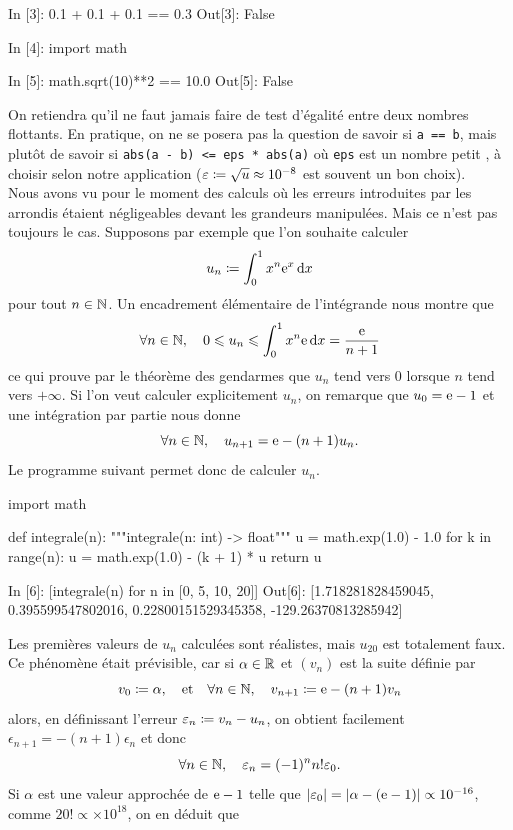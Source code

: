 \documentclass{magnolia}
\begin{document}
\begin{pythoncode}
In [3]: 0.1 + 0.1 + 0.1 == 0.3
Out[3]: False

In [4]: import math

In [5]: math.sqrt(10)**2 == 10.0 
Out[5]: False
\end{pythoncode}

\noindent
On retiendra qu'il ne faut jamais faire de test d'égalité entre deux nombres
flottants. En pratique, on ne se posera pas la question de savoir si \verb!a == b!, mais
plutôt de savoir si \verb!abs(a - b) <= eps * abs(a)! où \verb!eps! est un nombre
\og petit \fg, à choisir selon notre application ($\varepsilon\coloneqq\sqrt{u}\approx 10^{-8}$
est souvent un bon choix).\\

Nous avons vu pour le moment des calculs où les erreurs introduites par les arrondis
étaient négligeables devant les grandeurs manipulées. Mais ce n'est pas toujours le
cas. Supposons par exemple que l'on souhaite calculer
\[u_n\coloneqq\int_{0}^{1} x^n {\rm e}^x\,\text{d}x\]
pour tout $n\in\mathbb{N}$. Un encadrement élémentaire de l'intégrande nous montre que
\[\forall n\in\mathbb{N},\quad 0\leqslant u_n\leqslant \int_{0}^{1} x^n {\rm e}\,\text{d}x=\frac{{\rm e}}{n+1}\]
ce qui prouve par le théorème des gendarmes que $u_n$ tend vers
0 lorsque $n$ tend vers $+\infty$. Si l'on veut calculer explicitement $u_n$, 
on remarque que $u_0={\rm e}-1$ et une intégration par partie nous donne
\[\forall n\in\mathbb{N},\quad u_{n+1}={\rm e}-(n+1) u_{n}.\]
Le programme suivant permet donc de calculer $u_n$.
\begin{pythoncodeline}
import math

def integrale(n):
    """integrale(n: int) -> float"""
    u = math.exp(1.0) - 1.0
    for k in range(n):
        u = math.exp(1.0) - (k + 1) * u
    return u
\end{pythoncodeline}
\begin{pythoncode}
In [6]: [integrale(n) for n in [0, 5, 10, 20]]
Out[6]: [1.718281828459045, 0.395599547802016,
         0.22800151529345358, -129.26370813285942]
\end{pythoncode}
Les premières valeurs de $u_n$ calculées sont réalistes, mais $u_{20}$ est
totalement faux. Ce phénomène
était prévisible, car si $\alpha\in\mathbb{R}$ et $(v_n)$ est la suite définie par
\[v_0\coloneqq\alpha,\quad \text{et}\quad \forall n\in\mathbb{N},\quad v_{n+1}\coloneqq {\rm e}-(n+1)v_n\]
alors, en définissant l'erreur $\varepsilon_n\coloneqq v_n-u_n$, on obtient facilement $\epsilon_{n+1} = -(n+1)\epsilon_n$ et donc
\[\forall n\in\mathbb{N},\quad \varepsilon_n=(-1)^n n! \varepsilon_0.\]
Si $\alpha$ est une valeur approchée de ${\rm e} - 1$ telle que $\left|\varepsilon_0\right| = \left|\alpha - ({\rm e} - 1)\right| \propto 10^{-16}$, comme $20! \propto \times10^{18}$, on en déduit que
\end{document}

